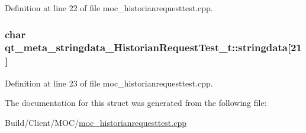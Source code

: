 Definition at line 22 of file moc\+\_\+historianrequesttest.\+cpp.

\hypertarget{structqt__meta__stringdata___historian_request_test__t_a8dfc92f1ad24d7e8bf83248b914af8bc}{}
\subsubsection[{stringdata}]{\setlength{\rightskip}{0pt plus 5cm}char qt\+\_\+meta\+\_\+stringdata\+\_\+\+Historian\+Request\+Test\+\_\+t\+::stringdata\mbox{[}21\mbox{]}}\label{structqt__meta__stringdata___historian_request_test__t_a8dfc92f1ad24d7e8bf83248b914af8bc}


Definition at line 23 of file moc\+\_\+historianrequesttest.\+cpp.



The documentation for this struct was generated from the following file\+:\begin{DoxyCompactItemize}
\item 
Build/\+Client/\+M\+O\+C/\hyperlink{moc__historianrequesttest_8cpp}{moc\+\_\+historianrequesttest.\+cpp}\end{DoxyCompactItemize}
